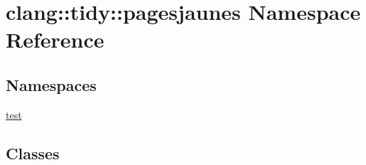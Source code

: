 \hypertarget{namespaceclang_1_1tidy_1_1pagesjaunes}{}\section{clang\+:\+:tidy\+:\+:pagesjaunes Namespace Reference}
\label{namespaceclang_1_1tidy_1_1pagesjaunes}
\subsection*{Namespaces}
\begin{DoxyCompactItemize}
\item 
 \hyperlink{namespaceclang_1_1tidy_1_1pagesjaunes_1_1test}{test}
\end{DoxyCompactItemize}
\subsection*{Classes}
